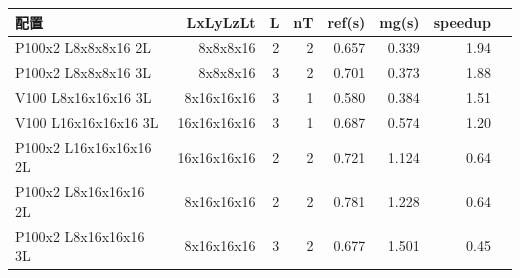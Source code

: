 \begin{tabular}{l|rrrrrrr}
\hline
配置 & LxLyLzLt & L & nT & ref(s) & mg(s) & speedup \\
\hline
P100x2 L8x8x8x16 2L & 8x8x8x16 & 2 & 2 & 0.657 & 0.339 & 1.94 \\
P100x2 L8x8x8x16 3L & 8x8x8x16 & 3 & 2 & 0.701 & 0.373 & 1.88 \\
V100 L8x16x16x16 3L & 8x16x16x16 & 3 & 1 & 0.580 & 0.384 & 1.51 \\
V100 L16x16x16x16 3L & 16x16x16x16 & 3 & 1 & 0.687 & 0.574 & 1.20 \\
P100x2 L16x16x16x16 2L & 16x16x16x16 & 2 & 2 & 0.721 & 1.124 & 0.64 \\
P100x2 L8x16x16x16 2L & 8x16x16x16 & 2 & 2 & 0.781 & 1.228 & 0.64 \\
P100x2 L8x16x16x16 3L & 8x16x16x16 & 3 & 2 & 0.677 & 1.501 & 0.45 \\
\hline
\end{tabular}
